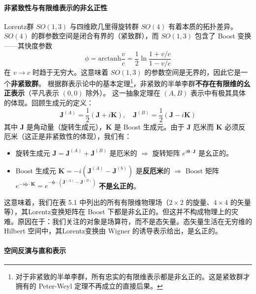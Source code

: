 \paragraph*{非紧致性与有限维表示的非幺正性}
Lorentz群 $SO(1,3)$ 与四维欧几里得旋转群 $SO(4)$ 有着本质的拓扑差异。$SO(4)$ 的群参数空间是闭合有界的（紧致群），而 $SO(1,3)$ 包含了 Boost 变换——其快度参数
\begin{equation}
    \phi = \text{arctanh}\frac{v}{c} = \frac{1}{2}\ln\frac{1+v/c}{1-v/c}
\end{equation}
在 $v\to c$ 时趋于无穷大。这意味着 $SO(1,3)$ 的参数空间是无界的，因此它是一个\textbf{非紧致群}。
根据群表示论中的基本定理\footnote{对于非紧致的半单李群，所有忠实的有限维表示都是非幺正的。这是紧致群才拥有的 Peter-Weyl 定理不再成立的直接后果。}，非紧致的半单李群\textbf{不存在有限维的幺正表示}（平凡表示 $(0,0)$ 除外）。
这一抽象定理在 $(A,B)$ 表示中有极其具体的体现。回顾生成元的定义：
\begin{equation}
    \boldsymbol{J}^{(A)} = \frac{1}{2}(\boldsymbol{J}+i\boldsymbol{K}),\quad \boldsymbol{J}^{(B)}= \frac{1}{2}(\boldsymbol{J}-i\boldsymbol{K})
\end{equation}
其中 $\boldsymbol{J}$ 是角动量（旋转生成元），$\boldsymbol{K}$ 是 Boost 生成元。由于 $\boldsymbol{J}$ 厄米而 $\boldsymbol{K}$ 必须反厄米（这正是非紧致性的体现），我们有：
\begin{itemize}
    \item 旋转生成元 $\boldsymbol{J} = \boldsymbol{J}^{(A)}+\boldsymbol{J}^{(B)}$ 是厄米的 $\Rightarrow$ 旋转矩阵 $e^{i\boldsymbol{\theta}\cdot\boldsymbol{J}}$ 是幺正的。
    \item Boost 生成元 $\boldsymbol{K} = -i(\boldsymbol{J}^{(A)}-\boldsymbol{J}^{(b)})$ 是\textbf{反厄米}的 $\Rightarrow$ Boost 矩阵 $e^{-i\boldsymbol{\phi}\cdot\boldsymbol{K}} = e^{-\boldsymbol{\phi}\cdot(\boldsymbol{J}^{(A)}-\boldsymbol{J}^{(B)})}$ \textbf{不是幺正的}。
\end{itemize}

这意味着，我们在表 5.1 中列出的所有有限维物理场（$2\times 2$ 的旋量、$4\times 4$ 的矢量等），其Lorentz变换矩阵在 Boost 下都是非幺正的。但这并不构成物理上的灾难。原因在于：我们关注的对象是场算符，而不是态矢量。态矢量生活在无穷维的 Hilbert 空间中，其Lorentz变换由 Wigner 的诱导表示给出，是幺正的。

\paragraph*{空间反演与直和表示}

